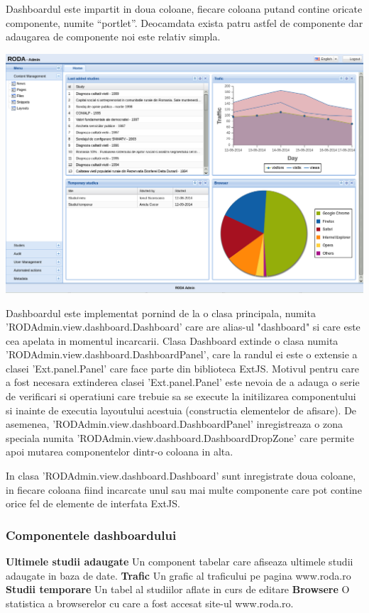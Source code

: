 Dashboardul este impartit in doua coloane, fiecare coloana putand contine oricate componente, numite “portlet”. Deocamdata exista patru astfel de componente dar adaugarea de componente noi este relativ simpla. 

\includegraphics[width=16cm]{img/dashboard}

Dashboardul este implementat pornind de la o clasa principala, numita 'RODAdmin.view.dashboard.Dashboard' care are alias-ul "dashboard" si care este cea apelata in momentul incarcarii. Clasa Dashboard extinde o clasa numita 'RODAdmin.view.dashboard.DashboardPanel', care la randul ei este o extensie a clasei 'Ext.panel.Panel' care face parte din biblioteca ExtJS. Motivul pentru care a fost necesara extinderea clasei 'Ext.panel.Panel' este nevoia de a adauga o serie de verificari si operatiuni care trebuie sa se execute la initilizarea componentului si inainte de executia layoutului acestuia (constructia elementelor de afisare). De asemenea, 'RODAdmin.view.dashboard.DashboardPanel' inregistreaza o zona speciala numita 'RODAdmin.view.dashboard.DashboardDropZone' care permite apoi mutarea componentelor dintr-o coloana in alta. 

In clasa 'RODAdmin.view.dashboard.Dashboard' sunt inregistrate doua coloane, in fiecare coloana fiind incarcate unul sau mai multe componente care pot contine orice fel de elemente de interfata ExtJS. 

\subsubsection{Componentele dashboardului}

\textbf{Ultimele studii adaugate} Un component tabelar care afiseaza ultimele studii adaugate in baza de date. 
\textbf{Trafic} Un grafic al traficului pe pagina www.roda.ro
\textbf{Studii temporare} Un tabel al studiilor aflate in curs de editare
\textbf{Browsere} O statistica a browserelor cu care a fost accesat site-ul www.roda.ro. 


